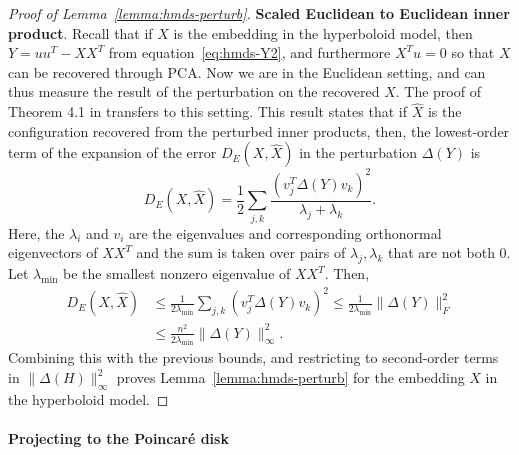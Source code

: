 \begin{proof}[Proof of Lemma~\ref{lemma:hmds-perturb}]

{\bf Scaled Euclidean to Euclidean inner product}.
Recall that if $X$ is the embedding in the hyperboloid model, then $Y = uu^T - XX^T$ from equation~\eqref{eq:hmds-Y2}, and furthermore $X^T u = 0$ so that $X$ can be recovered through PCA.
Now we are in the Euclidean setting, and can thus measure the result of the perturbation on the recovered $X$.
The proof of Theorem 4.1 in \citet{Sibson2} transfers to this setting.
This result states that if $\hat X$ is the configuration recovered from the perturbed inner products, then, the lowest-order term of the expansion of the error $D_E(X,\hat X)$ in the perturbation $\Delta(Y)$ is
\[
  D_E(X,\hat X) = \frac{1}{2} \sum_{j,k} \frac{(v_j^T \Delta(Y) v_k)^2}{\lambda_j + \lambda_k}.
\]
Here, the $\lambda_i$ and $v_i$ are the eigenvalues and corresponding orthonormal eigenvectors of $XX^T$ and the sum is taken over pairs of $\lambda_{j}, \lambda_k$ that are not both 0.
Let $\lambda_{\min}$ be the smallest nonzero eigenvalue of $XX^T$. Then,
\begin{align*}
  D_E(X,\hat X) 
  &\le 
  \frac{1}{2 \lambda_{\min}} \sum_{j,k} (v_j^T \Delta(Y) v_k)^2
  \le
  \frac{1}{2 \lambda_{\min}} \| \Delta(Y) \|_F^2 \\
  &\le
  \frac{n^2}{2 \lambda_{\min}} \| \Delta(Y) \|_{\infty}^2.
\end{align*}
Combining this with the previous bounds, and restricting to second-order terms in $\| \Delta(H) \|_{\infty}^2$ proves Lemma~\ref{lemma:hmds-perturb} for the embedding $X$ in the hyperboloid model.
\end{proof}

\paragraph{Projecting to the Poincar{\'e} disk}

